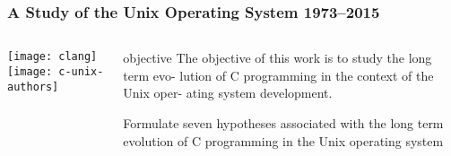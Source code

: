 \begin{frame}[plain]
	\frametitle{A Study of the Unix Operating System 1973–2015}
	
	
	
	\begin{columns}
		
		\begin{column}{.3\textwidth}
			
			\texttt{[image: clang]}
			\texttt{[image: c-unix-authors]}
		\end{column}
		
		\begin{column}{.7\textwidth}
			
			\LARGE
			\begin{block}{objective}
			The objective of this work is to study the long term evo-
			lution of C programming in the context of the Unix oper-
			ating system development. 
			\end{block}
		
			Formulate seven hypotheses associated with the long term evolution of C programming in		the Unix operating system

			
		\end{column}
		
		
	\end{columns}
	
	
\end{frame}



